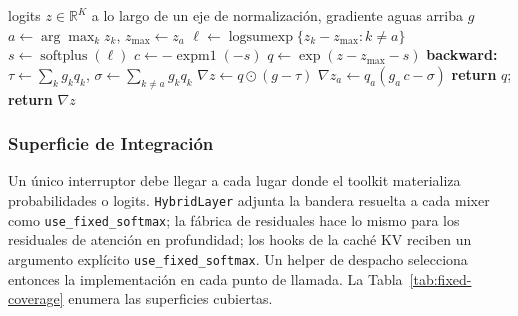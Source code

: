 \begin{algorithm}[H]
\caption{Softmax corregido (forward + producto vector--jacobiano)}
\begin{algorithmic}[1]
\Require logits $z \in \mathbb{R}^{K}$ a lo largo de un eje de normalización, gradiente aguas arriba $g$
\State $a \gets \arg\max_k z_k$, \quad $z_{\max} \gets z_a$
\State $\ell \gets \operatorname{logsumexp}\{z_k - z_{\max} : k \neq a\}$ 
\State $s \gets \operatorname{softplus}(\ell)$ 
\State $c \gets -\operatorname{expm1}(-s)$ 
\State $q \gets \exp(z - z_{\max} - s)$ 
\State \textbf{backward:}
\State $\tau \gets \sum_k g_k q_k$, \quad $\sigma \gets \sum_{k \neq a} g_k q_k$
\State $\nabla z \gets q \odot (g - \tau)$
\State $\nabla z_a \gets q_a\left(g_a\,c - \sigma\right)$ 
\State \textbf{return} $q$; \quad \textbf{return} $\nabla z$
\end{algorithmic}
\end{algorithm}

\subsubsection{Superficie de Integración}

Un único interruptor debe llegar a cada lugar donde el toolkit materializa probabilidades o logits. \texttt{HybridLayer} adjunta la bandera resuelta a cada mixer como \texttt{use\_fixed\_softmax}; la fábrica de residuales hace lo mismo para los residuales de atención en profundidad; los hooks de la caché KV reciben un argumento explícito \texttt{use\_fixed\_softmax}. Un helper de despacho selecciona entonces la implementación en cada punto de llamada. La Tabla~\ref{tab:fixed-coverage} enumera las superficies cubiertas.

